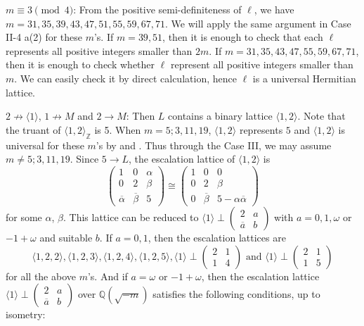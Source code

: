 \documentclass[a4paper,10pt,reqno]{amsart}
\begin{document}
{} $m \equiv 3 \pmod{4}$: From the positive semi-definiteness of $\ell$, we have $m =
31, 35, 39, 43, 47, 51, 55, 59, 67, 71$. We will apply the same argument in Case II-4 a(2) for
these $m$'s. If $m = 39,51$, then it is enough to check that each $\ell$ represents all positive
integers smaller than $2m$. If $m = 31, 35, 43, 47, 55, 59, 67, 71$, then it is enough to check
whether $\ell$  represent all positive integers smaller than $m$. We can easily check it by direct
calculation, hence $\ell$ is a universal Hermitian lattice.

{} $2 \not\to {\langle {1} \rangle}$, $1 \not\to M$ and $2 \to M$: Then $L$ contains a binary lattice
${\langle {1,2} \rangle}$. Note that the truant of ${\langle {1,2} \rangle}_{\mathbb{Z}}$ is 5. When $m = 5; 3, 11, 19$, ${\langle {1,2} \rangle}$
represents $5$ and ${\langle {1,2} \rangle}$ is universal for these $m$'s by \cite{agE_aK_97} and \cite{hI_00}.
Thus through the Case III, we may assume $m \ne 5; 3, 11, 19$. Since $5 \to L$, the escalation
lattice of ${\langle {1,2} \rangle}$ is
\[
    {\begin{pmatrix}
  1 & 0 & \alpha \\
  0 & 2 & \beta \\
  {{\overline{{\alpha}}}} & {{\overline{{\beta}}}} & 5
\end{pmatrix}}
    \cong
    {\begin{pmatrix}
  1 & 0 & 0 \\
  0 & 2 & \beta \\
  0 & {{\overline{{\beta}}}} & {5-\alpha{\overline{{\alpha}}}}
\end{pmatrix}}
\]
for some $\alpha$, $\beta$. This lattice can be reduced to ${\langle {1} \rangle} \perp{\begin{pmatrix}
  2 & a \\
  {{\overline{{a}}}} & b
\end{pmatrix}}$
with $a = 0, 1, \omega$ or $-1+\omega$ and suitable $b$. If $a = 0, 1$, then the escalation
lattices are
\[
    {\langle {1,2,2} \rangle},
    {\langle {1,2,3} \rangle},
    {\langle {1,2,4} \rangle},
    {\langle {1,2,5} \rangle},
    {\langle {1} \rangle} \perp {\begin{pmatrix}
  2 & 1 \\
  1 & 4
\end{pmatrix}} \text{ and }
    {\langle {1} \rangle} \perp {\begin{pmatrix}
  2 & 1 \\
  1 & 5
\end{pmatrix}}
\]
for all the above $m$'s. And if $a=\omega$ or $-1+\omega$, then the escalation lattice ${\langle {1} \rangle}
\perp{\begin{pmatrix}
  2 & a \\
  {{\overline{{a}}}} & b
\end{pmatrix}}$ over ${\mathbb{Q}(\sqrt{{-m}})}$ satisfies the following conditions, up to isometry:
\end{document}
